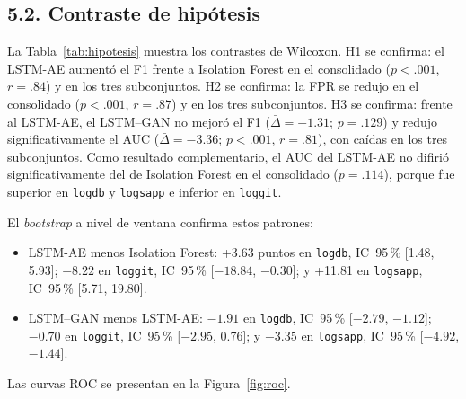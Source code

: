 \documentclass[jou,a4paper,floatsintext,donotrepeattitle]{apa7}
\begin{document}
\subsection{5.2. Contraste de hipótesis}
La Tabla~\ref{tab:hipotesis} muestra los contrastes de Wilcoxon. H1 se confirma: el LSTM-AE aumentó el F1 frente a Isolation Forest en el consolidado ($p < .001$, $r = .84$) y en los tres subconjuntos. H2 se confirma: la FPR se redujo en el consolidado ($p < .001$, $r = .87$) y en los tres subconjuntos. H3 se confirma: frente al LSTM-AE, el LSTM--GAN no mejoró el F1 ($\bar{\Delta} = -1.31$; $p = .129$) y redujo significativamente el AUC ($\bar{\Delta} = -3.36$; $p < .001$, $r = .81$), con caídas en los tres subconjuntos. Como resultado complementario, el AUC del LSTM-AE no difirió significativamente del de Isolation Forest en el consolidado ($p = .114$), porque fue superior en \texttt{logdb} y \texttt{logsapp} e inferior en \texttt{loggit}.

El \textit{bootstrap} a nivel de ventana confirma estos patrones:

\begin{itemize}
  \item LSTM-AE menos Isolation Forest: +3.63 puntos en \texttt{logdb}, IC~95\,\% [1.48, 5.93]; $-8.22$ en \texttt{loggit}, IC~95\,\% [$-18.84$, $-0.30$]; y +11.81 en \texttt{logsapp}, IC~95\,\% [5.71, 19.80].
  \item LSTM--GAN menos LSTM-AE: $-1.91$ en \texttt{logdb}, IC~95\,\% [$-2.79$, $-1.12$]; $-0.70$ en \texttt{loggit}, IC~95\,\% [$-2.95$, 0.76]; y $-3.35$ en \texttt{logsapp}, IC~95\,\% [$-4.92$, $-1.44$].
\end{itemize}

Las curvas ROC se presentan en la Figura~\ref{fig:roc}.
\end{document}
